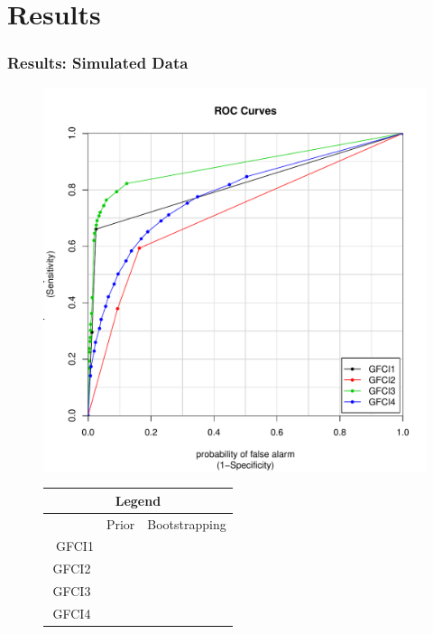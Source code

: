 \documentclass[10pt, compress]{beamer}
\newcommand{\cmark}{\ding{51}}%
\newcommand{\xmark}{\ding{55}}%
\newcommand{\Sara}[1]{{\color{blue} Sara: #1}}
\begin{document}
\section{Results}
\begin{frame}
    \frametitle{Results: Simulated Data}
    \begin{figure}
        \centering
        \begin{minipage}{0.6\textwidth}
            \centering
            \includegraphics[width=\textwidth]{combinedSimCurvesGFCI}%
        \end{minipage}\hfill
        \begin{minipage}{0.4\textwidth}
            \centering
            \renewcommand{\arraystretch}{1}
            \setlength{\tabcolsep}{5pt}
            \begin{tabular}{|c|c|c|}
                \multicolumn{3}{c}{\large{\textbf{Legend}}}\\
                \hline
                       & Prior & Bootstrapping\\\
                 GFCI1 & \cmark & \xmark\\
                 GFCI2 & \xmark & \xmark\\
                 GFCI3 & \cmark & \cmark \\
                 GFCI4 & \xmark & \cmark\\
                 \hline
            \end{tabular}
        \end{minipage}
    \end{figure}
\end{frame}
\end{document}
